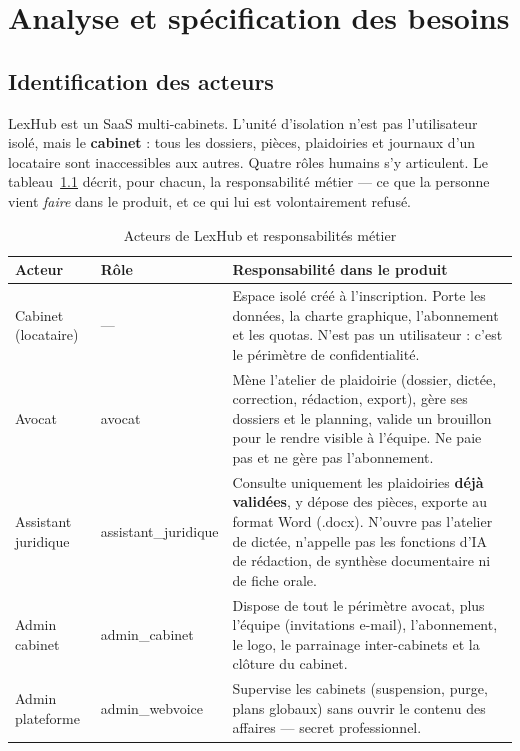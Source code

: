 \chapter{Analyse et spécification des besoins}
\label{ch:analyse}

\section{Identification des acteurs}

LexHub est un SaaS multi-cabinets. L'unité d'isolation n'est pas l'utilisateur isolé, mais le \textbf{cabinet} : tous les dossiers, pièces, plaidoiries et journaux d'un locataire sont inaccessibles aux autres. Quatre rôles humains s'y articulent. Le tableau~\ref{tab:acteurs} décrit, pour chacun, la responsabilité métier --- ce que la personne vient \emph{faire} dans le produit, et ce qui lui est volontairement refusé.

\begin{table}[H]
\centering
\caption{Acteurs de LexHub et responsabilités métier}
\label{tab:acteurs}
\small
\renewcommand{\arraystretch}{1.28}
\begin{tabular}{@{}>{\raggedright\arraybackslash}p{3.1cm}>{\ttfamily}l>{\raggedright\arraybackslash}p{7.4cm}@{}}
\toprule
\textbf{Acteur} & \textbf{Rôle} & \textbf{Responsabilité dans le produit} \\
\midrule
Cabinet (locataire) & --- &
Espace isolé créé à l'inscription. Porte les données, la charte graphique, l'abonnement et les quotas. N'est pas un utilisateur : c'est le périmètre de confidentialité. \\
\midrule
Avocat & avocat &
Mène l'atelier de plaidoirie (dossier, dictée, correction, rédaction, export), gère ses dossiers et le planning, valide un brouillon pour le rendre visible à l'équipe. Ne paie pas et ne gère pas l'abonnement. \\
\midrule
Assistant juridique & assistant\_juridique &
Consulte uniquement les plaidoiries \textbf{déjà validées}, y dépose des pièces, exporte au format Word (.docx). N'ouvre pas l'atelier de dictée, n'appelle pas les fonctions d'IA de rédaction, de synthèse documentaire ni de fiche orale. \\
\midrule
Admin cabinet & admin\_cabinet &
Dispose de tout le périmètre avocat, plus l'équipe (invitations e-mail), l'abonnement, le logo, le parrainage inter-cabinets et la clôture du cabinet. \\
\midrule
Admin plateforme & admin\_webvoice &
Supervise les cabinets (suspension, purge, plans globaux) sans ouvrir le contenu des affaires --- secret professionnel. \\
\bottomrule
\end{tabular}
\end{table}

